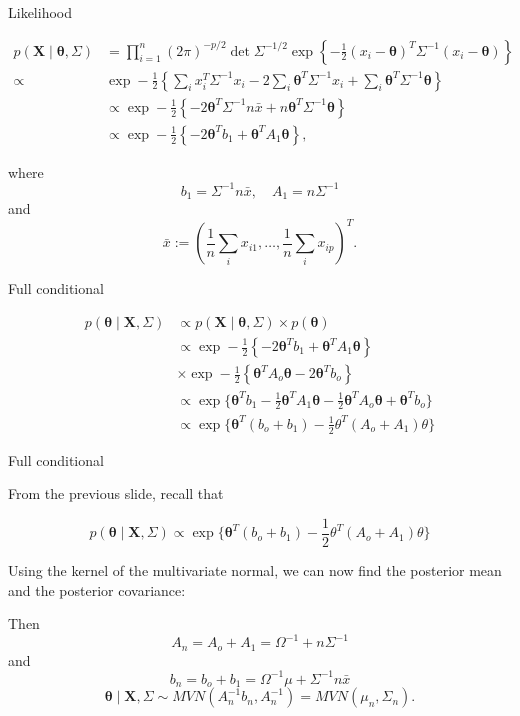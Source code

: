 \documentclass[ignorenonframetext,]{beamer}
\newcommand{\btheta}{{\bm\theta}}
\newcommand{\bx}{\ensuremath{\mathbf{X}}}
\begin{document}
\begin{frame}{Likelihood}

\begin{align}
p(\bx \mid \btheta, \Sigma) &= \prod_{i=1}^n
{\left(2\pi\right)}^{-p/2}\det{\Sigma}^{-1/2} \exp{\left\{-\frac{1}{2} (x_i-\btheta)^T\Sigma^{-1} (x_i - \btheta)\right\}}\\
\propto 
& \exp-\frac{1}{2} {\left \{ \sum_i x_i^T \Sigma^{-1} x_i -2 \sum_i \btheta^T \Sigma^{-1} x_i + 
\sum_i \btheta^T\Sigma^{-1} \btheta 
 \right \}}\\
 & \propto \exp-\frac{1}{2} {\left \{  -2 \btheta^T \Sigma^{-1} n\bar{x} + 
n \btheta^T\Sigma^{-1} \btheta 
 \right \}}\\
  & \propto \exp-\frac{1}{2} {\left \{  -2 \btheta^T b_1+ 
\btheta^T A_1 \btheta \right \}},
\end{align}

where \[b_1= \Sigma^{-1} n\bar{x}, \quad A_1 = n\Sigma^{-1}\] and
\[\bar{x} := (\frac{1}{n}\sum_i x_{i1} ,\ldots, \frac{1}{n} \sum_i x_{ip})^T.\]

\end{frame}

\begin{frame}{Full conditional}

\begin{align}
p(\btheta \mid \bx, \Sigma) &\propto
p(\bx \mid \btheta, \Sigma) \times p(\btheta) \\
&\propto 
\exp-\frac{1}{2} {\left \{  -2 \btheta^T b_1+ 
\btheta^T A_1 \btheta \right \}} \\
&\times
\exp-\frac{1}{2} {\left \{\btheta^TA_o \btheta - 2 \btheta^T b_o  \right \}}\\
&\propto \exp\{\btheta^T b_1 - \frac{1}{2}\btheta^T A_1 \btheta- \frac{1}{2}\btheta^TA_o  \btheta
+ \btheta^T b_o\}\\
& \propto\exp\{
\btheta^T( b_o + b_1) -\frac{1}{2}\theta^T(A_o + A_1) \theta
\}
\end{align}

\end{frame}

\begin{frame}{Full conditional}

From the previous slide, recall that

\[p(\btheta \mid \bx, \Sigma) \propto
\exp\{
\btheta^T( b_o + b_1) -\frac{1}{2}\theta^T(A_o + A_1) \theta
\}\]

Using the kernel of the multivariate normal, we can now find the
posterior mean and the posterior covariance:

Then \[A_n = A_o + A_1 = \Omega^{-1}+n\Sigma^{-1}\] and
\[b_n = b_o + b_1 = \Omega^{-1}\mu + \Sigma^{-1} n\bar{x}\]
\[\btheta \mid \bx, \Sigma \sim MVN(A_n^{-1}b_n, A_n^{-1}) = MVN(\mu_n, \Sigma_n).\]

\end{frame}
\end{document}
